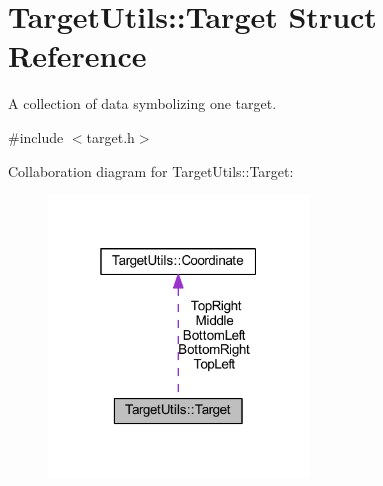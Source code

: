 \hypertarget{struct_target_utils_1_1_target}{\section{\-Target\-Utils\-:\-:\-Target \-Struct \-Reference}
\label{struct_target_utils_1_1_target}
}


\-A collection of data symbolizing one target.  




{\ttfamily \#include $<$target.\-h$>$}



\-Collaboration diagram for \-Target\-Utils\-:\-:\-Target\-:\nopagebreak
\begin{figure}[H]
\begin{center}
\leavevmode
\includegraphics[width=196pt]{struct_target_utils_1_1_target__coll__graph}
\end{center}
\end{figure}
